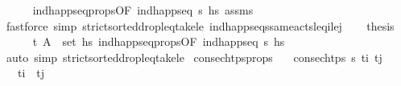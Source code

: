 \begin{isabellebody}
\ \ \ \ \isamarkupfalse%
\ ind{\isacharunderscore}{\kern0pt}happ{\isacharunderscore}{\kern0pt}seq{\isacharunderscore}{\kern0pt}props{\isacharparenleft}{\kern0pt}{}{\isacharparenright}{\kern0pt}{\isacharbrackleft}{\kern0pt}OF\ {\isacartoucheopen}ind{\isacharunderscore}{\kern0pt}happ{\isacharunderscore}{\kern0pt}seq\ {\isasympi}s\ hs{\isacartoucheclose}{\isacharbrackright}{\kern0pt}\ assms\isanewline
\ \ \ \ \isamarkupfalse%
\ {\isacharparenleft}{\kern0pt}fastforce\ simp{\isacharcolon}{\kern0pt}\ strict{\isacharunderscore}{\kern0pt}sorted{\isacharunderscore}{\kern0pt}drop{\isacharunderscore}{\kern0pt}leq{\isacharunderscore}{\kern0pt}take{\isacharunderscore}{\kern0pt}le{\isacharprime}{\kern0pt}\ ind{\isacharunderscore}{\kern0pt}happ{\isacharunderscore}{\kern0pt}seqs{\isacharunderscore}{\kern0pt}same{\isacharunderscore}{\kern0pt}acts{\isacharunderscore}{\kern0pt}leq\isactrlsub i{\isacharunderscore}{\kern0pt}le\isactrlsub j{\isacharprime}{\kern0pt}{\isacharparenright}{\kern0pt}\isanewline
\ \ \isamarkupfalse%
\ {\isacharquery}{\kern0pt}thesis\isanewline
\ \ \ \ \isamarkupfalse%
\ {\isacartoucheopen}{\isacharparenleft}{\kern0pt}t{\isacharcomma}{\kern0pt}\ A{\isacharparenright}{\kern0pt}\ {\isasymin}\ set\ hs{\isacartoucheclose}\ ind{\isacharunderscore}{\kern0pt}happ{\isacharunderscore}{\kern0pt}seq{\isacharunderscore}{\kern0pt}props{\isacharparenleft}{\kern0pt}{}{\isacharparenright}{\kern0pt}{\isacharbrackleft}{\kern0pt}OF\ {\isacartoucheopen}ind{\isacharunderscore}{\kern0pt}happ{\isacharunderscore}{\kern0pt}seq\ {\isasympi}s\ hs{\isacharprime}{\kern0pt}{\isacartoucheclose}{\isacharbrackright}{\kern0pt}\isanewline
\ \ \ \ \isamarkupfalse%
\ {\isacharparenleft}{\kern0pt}auto\ simp{\isacharcolon}{\kern0pt}\ strict{\isacharunderscore}{\kern0pt}sorted{\isacharunderscore}{\kern0pt}drop{\isacharunderscore}{\kern0pt}leq{\isacharunderscore}{\kern0pt}take{\isacharunderscore}{\kern0pt}le{\isacharprime}{\kern0pt}{\isacharparenright}{\kern0pt}\isanewline
{}\isamarkupfalse%
%
\endisatagproof
{\isafoldproof}%
%
\isadelimproof
\isanewline
%
\endisadelimproof
\isanewline
{}\isamarkupfalse%
\ consec{\isacharunderscore}{\kern0pt}htps{\isacharunderscore}{\kern0pt}props{\isacharcolon}{\kern0pt}\isanewline
\ \ \ {\isachardoublequoteopen}consec{\isacharunderscore}{\kern0pt}htps\ {\isasympi}s\ t\isactrlsub i\ t\isactrlsub j{\isachardoublequoteclose}\isanewline
\ \ \ {\isachardoublequoteopen}t\isactrlsub i\ {\isacharless}{\kern0pt}\ t\isactrlsub j{\isachardoublequoteclose}\isanewline

\end{isabellebody}
